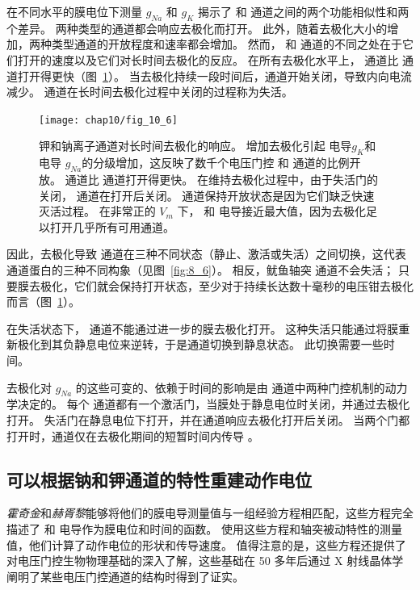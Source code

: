 在不同水平的膜电位下测量 $g_{Na}$ 和 $g_K$ 揭示了  和  通道之间的两个功能相似性和两个差异。
两种类型的通道都会响应去极化而打开。
此外，随着去极化大小的增加，两种类型通道的开放程度和速率都会增加。
然而， 和  通道的不同之处在于它们打开的速度以及它们对长时间去极化的反应。
在所有去极化水平上， 通道比  通道打开得更快（图~\ref{fig:10_6}）。 
当去极化持续一段时间后，通道开始关闭，导致内向电流减少。
 通道在长时间去极化过程中关闭的过程称为失活。


\begin{figure}[htbp]
	\centering
	\texttt{[image: chap10/fig\_10\_6]}
	\caption{钾和钠离子通道对长时间去极化的响应。
		增加去极化引起  电导$g_K$和  电导 $g_{Na}$的分级增加，这反映了数千个电压门控  和  通道的比例开放。
		 通道比  通道打开得更快。
		在维持去极化过程中，由于失活门的关闭， 通道在打开后关闭。
		 通道保持开放状态是因为它们缺乏快速灭活过程。
		在非常正的 $V_m$ 下， 和  电导接近最大值，因为去极化足以打开几乎所有可用通道。}
	\label{fig:10_6}
\end{figure}


因此，去极化导致  通道在三种不同状态（静止、激活或失活）之间切换，这代表  通道蛋白的三种不同构象（见图~\ref{fig:8_6}）。
相反，鱿鱼轴突  通道不会失活；
只要膜去极化，它们就会保持打开状态，至少对于持续长达数十毫秒的电压钳去极化而言（图~\ref{fig:10_6}）。


在失活状态下， 通道不能通过进一步的膜去极化打开。
这种失活只能通过将膜重新极化到其负静息电位来逆转，于是通道切换到静息状态。
此切换需要一些时间。


去极化对 $g_{Na}$ 的这些可变的、依赖于时间的影响是由  通道中两种门控机制的动力学决定的。
每个  通道都有一个激活门，当膜处于静息电位时关闭，并通过去极化打开。
失活门在静息电位下打开，并在通道响应去极化打开后关闭。
当两个门都打开时，通道仅在去极化期间的短暂时间内传导 。



\subsection{可以根据钠和钾通道的特性重建动作电位}

\textit{霍奇金}和\textit{赫胥黎}能够将他们的膜电导测量值与一组经验方程相匹配，这些方程完全描述了  和  电导作为膜电位和时间的函数。
使用这些方程和轴突被动特性的测量值，他们计算了动作电位的形状和传导速度。
值得注意的是，这些方程还提供了对电压门控生物物理基础的深入了解，这些基础在 50 多年后通过 X 射线晶体学阐明了某些电压门控通道的结构时得到了证实。


